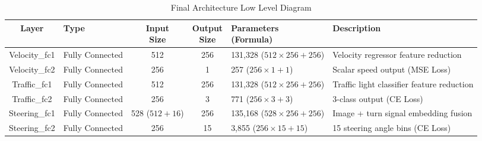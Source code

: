 \documentclass{article} %
\begin{document}
\begin{table}[h]
\centering
\caption{Final Architecture Low Level Diagram}
\vspace{0.5em}
\label{fig:LayerTable}
\begin{tabular}{|c|p{2cm}|c|c|p{3cm}|p{4cm}|}
\hline
\textbf{Layer} & \textbf{Type} & \shortstack{\textbf{Input} \\ \textbf{Size}} & \shortstack{\textbf{Output} \\ \textbf{Size}} & \shortstack{\textbf{Parameters} \\ \textbf{(Formula)}} & \textbf{Description} \\ \hline

Velocity\_fc1 & Fully \newline Connected & 512 & 256 & 131,328 \newline ($512 \times 256 + 256$) & Velocity regressor \newline feature reduction \\ \hline
Velocity\_fc2 & Fully \newline Connected & 256 & 1 & 257 \newline ($256 \times 1 + 1$) & Scalar speed output \newline (MSE Loss) \\ \hline

Traffic\_fc1 & Fully \newline Connected & 512 & 256 & 131,328 \newline ($512 \times 256 + 256$) & Traffic light classifier \newline feature reduction \\ \hline
Traffic\_fc2 & Fully \newline Connected & 256 & 3 & 771 \newline ($256 \times 3 + 3$) & 3-class output \newline (CE Loss) \\ \hline

Steering\_fc1 & Fully \newline Connected & 528 ($512{+}16$) & 256 & 135,168 \newline ($528 \times 256 + 256$) & Image + turn signal \newline embedding fusion \\ \hline
Steering\_fc2 & Fully \newline Connected & 256 & 15 & 3,855 \newline ($256 \times 15 + 15$) & 15 steering angle bins \newline (CE Loss) \\ \hline

\end{tabular}
\end{table}
\end{document}
